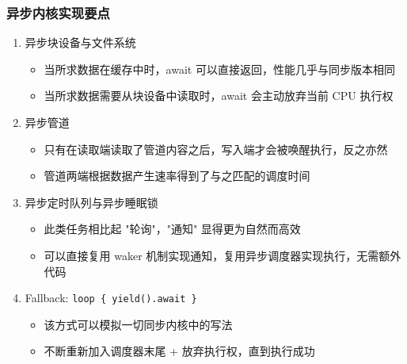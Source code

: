 \begin{frame}
    \frametitle{异步内核实现要点}

    \begin{enumerate}
        \item 异步块设备与文件系统
              \begin{itemize}
                  \item 当所求数据在缓存中时，await 可以直接返回，性能几乎与同步版本相同
                  \item 当所求数据需要从块设备中读取时，await 会主动放弃当前 CPU 执行权
              \end{itemize}
        \item 异步管道
              \begin{itemize}
                  \item 只有在读取端读取了管道内容之后，写入端才会被唤醒执行，反之亦然
                  \item 管道两端根据数据产生速率得到了与之匹配的调度时间
              \end{itemize}
        \item 异步定时队列与异步睡眠锁
              \begin{itemize}
                  \item 此类任务相比起 "轮询"，"通知" 显得更为自然而高效
                  \item 可以直接复用 waker 机制实现通知，复用异步调度器实现执行，无需额外代码
              \end{itemize}
        \item Fallback: \texttt{loop \{ yield().await \}}
              \begin{itemize}
                  \item 该方式可以模拟一切同步内核中的写法
                  \item 不断重新加入调度器末尾 + 放弃执行权，直到执行成功
              \end{itemize}
    \end{enumerate}
\end{frame}


